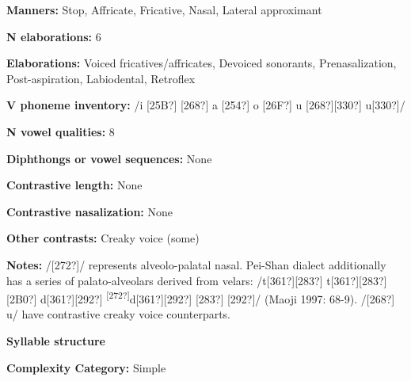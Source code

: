 \begin{styleBody}
\textbf{Manners:} Stop, Affricate, Fricative, Nasal, Lateral approximant
\end{styleBody}

\begin{styleBody}
\textbf{N elaborations:} 6
\end{styleBody}

\begin{styleBody}
\textbf{Elaborations:} Voiced fricatives/affricates, Devoiced sonorants, Prenasalization, Post-aspiration, Labiodental, Retroflex
\end{styleBody}

\begin{styleBody}
\textbf{V phoneme inventory:} /i [25B?] [268?] a [254?] o [26F?] u [268?][330?] u[330?]/
\end{styleBody}

\begin{styleBody}
\textbf{N vowel qualities:} 8
\end{styleBody}

\begin{styleBody}
\textbf{Diphthongs or vowel sequences:} None
\end{styleBody}

\begin{styleBody}
\textbf{Contrastive length:} None
\end{styleBody}

\begin{styleBody}
\textbf{Contrastive nasalization:} None
\end{styleBody}

\begin{styleBody}
\textbf{Other contrasts:} Creaky voice (some)
\end{styleBody}

\begin{styleBody}
\textbf{Notes:} /[272?]/ represents alveolo-palatal nasal. Pei-Shan dialect additionally has a series of palato-alveolars derived from velars: /t[361?][283?] t[361?][283?][2B0?] d[361?][292?] \textsuperscript{[272?]}d[361?][292?] [283?] [292?]/ (Maoji 1997: 68-9). /[268?] u/ have contrastive creaky voice counterparts.
\end{styleBody}

\begin{styleBody}
\textbf{Syllable structure}
\end{styleBody}

\begin{styleBody}
\textbf{Complexity Category:} Simple
\end{styleBody}

